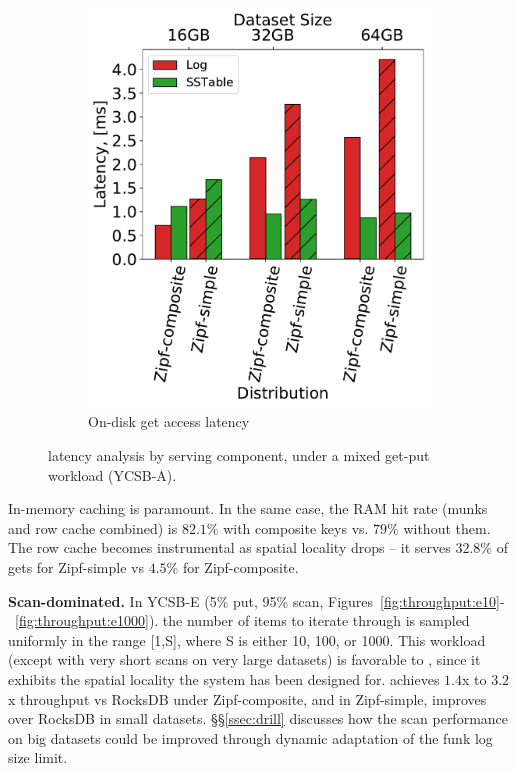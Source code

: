 \begin{figure}[htb]
\begin{subfigure}{0.49\linewidth}
\includegraphics[width=\textwidth]{figs/Latency_A.pdf}
\caption{On-disk get access latency}
\label{fig:readstat:lat}
\end{subfigure}
\caption{{\sys\/ latency analysis by serving component, under a mixed get-put workload (YCSB-A).}}
\label{fig:readstat}
\end{figure}

In-memory caching is paramount. In the same case, the RAM hit rate 
(munks and row cache combined) is $82.1\%$ with composite keys vs. $79\%$ without them. 
The row cache becomes instrumental as spatial locality drops -- it serves $32.8\%$ of gets for Zipf-simple 
vs $4.5\%$ for Zipf-composite. 

{\bf Scan-dominated.} In YCSB-E (5\% put, 95\% scan, Figures~\ref{fig:throughput:e10}-~\ref{fig:throughput:e1000}).
the number of items to iterate through is  
sampled uniformly in the range [1,S], where S is either 10, 100, or 1000. 
This workload (except with very short scans on very large datasets) is favorable to \sys, 
since it exhibits the spatial locality the system has been designed for. 
\sys\/ achieves $1.4$x to $3.2$x throughput vs RocksDB under Zipf-composite, and in Zipf-simple, improves over RocksDB in small datasets. 
\S\S\ref{ssec:drill} discusses how the scan performance on big datasets could be improved through dynamic adaptation of the 
funk log size limit.
 
